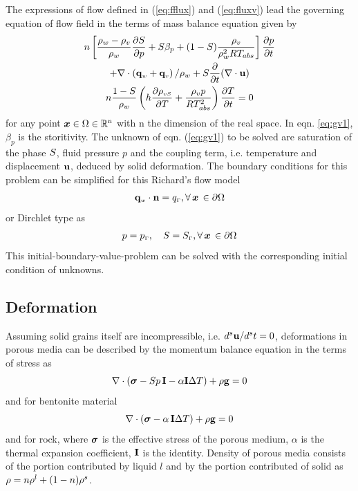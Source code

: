  The expressions of flow defined in (\ref{eq:fflux}) and (\ref{eq:fluxv}) lead the
governing equation of flow field in the terms of mass balance
equation given by
\begin{gather}
n\left[\dfrac{\rho_w-\rho_v}{\rho_w}\dfrac{\partial S}{\partial p}+
S\beta_p+(1-S)\dfrac{\rho_v}{\rho^2_w R T_{abs}}   \right]
\dfrac{\partial p }{\partial t} \nonumber
\\
+  \nabla \cdot \left(\mathbf{q}_{\scriptscriptstyle w}+\mathbf{q}_{\scriptscriptstyle v}\right)/\rho_w+S
\frac{\partial}{\partial t}(\nabla\cdot \mathbf u) \nonumber
\\
n \dfrac{1-S}{\rho_w}\left(h \dfrac{\partial \rho_{\scriptscriptstyle
vS}}{\partial T} +\dfrac{\rho_v p}{R T^2_{abs}}  \right) \dfrac{\partial T }{\partial t} =0
  \label{eq:gv1}
\end{gather}
for any point $\bm x\in \Omega\in \mathbb{R}^{\mathrm{n}}$ with
$\mathrm n$ the dimension of the real space. %
In eqn. \ref{eq:gv1}, $\beta_p$ is the storitivity.  The unknown of
eqn. (\ref{eq:gv1}) to be solved are saturation of the phase
$S$, fluid pressure
 $p$ and the coupling term, i.e. temperature and displacement $\mathbf u$,
deduced by solid deformation.  The boundary conditions for this
problem can be simplified for this Richard's flow model
\begin{gather}
\mathbf{q}_{\scriptscriptstyle w}\cdot \mathbf n = q_{\scriptscriptstyle{\Gamma}}, \forall\,
\bm x\,\in
\partial \Omega
 \label{eq:bcgv1}
\end{gather}
or Dirchlet type as
\begin{gather}
p = p_{\scriptscriptstyle{\Gamma}}, \quad S =
S_{\scriptscriptstyle{\Gamma}},
 \forall\, \bm x\, \in \partial \Omega
 \label{eq:bcgv2}
\end{gather}
This initial-boundary-value-problem can be solved with the
corresponding initial condition of unknowns.
\subsection{Deformation}
Assuming solid grains itself are incompressible, i.e. $d^s\mathbf u/d^s
t = 0$, deformations in porous media can be described by the
momentum balance equation in the terms of stress as
\begin{equation}
\nabla \cdot (\bm \sigma -S p\, \mathbf I -\alpha \mathbf I \Delta T) + \rho\mathbf g
= 0 \label{eq:momb1}
\end{equation}
and  for bentonite material
\begin{equation}
\nabla \cdot (\bm \sigma  -\alpha\, \mathbf I \Delta T) + \rho\mathbf g = 0
\label{eq:momb2}
\end{equation}
and for rock,  where $\bm \sigma$ is the effective stress of the porous
medium, $\alpha$ is the thermal expansion coefficient,  $\mathbf I$ is the
identity. Density of porous media consists of the portion
contributed by liquid $l$ and by the portion contributed of solid as
$\rho=n\rho^l+(1-n)\rho^s$.

